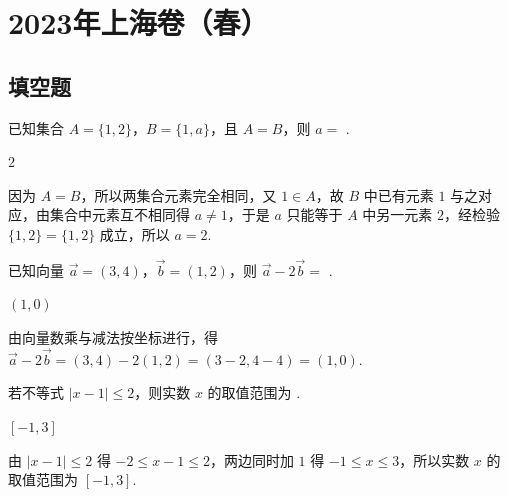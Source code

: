 \chapter{2023年上海卷（春）}

\section{填空题}

\begin{problem}
已知集合 \(A=\{1,2\}\)，\(B=\{1,a\}\)，且 \(A=B\)，则 \(a=\)\fillinblank{} .
\end{problem}

\begin{answer}
\(2\)
\end{answer}

\begin{solution}
因为 \(A=B\)，所以两集合元素完全相同，又 \(1\in A\)，故 \(B\) 中已有元素 \(1\) 与之对应，由集合中元素互不相同得 \(a\ne 1\)，于是 \(a\) 只能等于 \(A\) 中另一元素 \(2\)，经检验 \(\{1,2\}=\{1,2\}\) 成立，所以 \(a=2\).
\end{solution}

\begin{problem}
已知向量 \(\overrightarrow{a}=(3,4)\)，\(\overrightarrow{b}=(1,2)\)，则 \(\overrightarrow{a}-2\overrightarrow{b}=\)\fillinblank{} .
\end{problem}

\begin{answer}
\(\left(1,0\right)\)
\end{answer}

\begin{solution}
由向量数乘与减法按坐标进行，得 \(\overrightarrow{a}-2\overrightarrow{b}=(3,4)-2(1,2)=(3-2,4-4)=\left(1,0\right)\).
\end{solution}

\begin{problem}
若不等式 \(\left|x-1\right|\le 2\)，则实数 \(x\) 的取值范围为\fillinblank{} .
\end{problem}

\begin{answer}
\(\left[-1,3\right]\)
\end{answer}

\begin{solution}
由 \(\left|x-1\right|\le 2\) 得 \(-2\le x-1\le 2\)，两边同时加 \(1\) 得 \(-1\le x\le 3\)，所以实数 \(x\) 的取值范围为 \(\left[-1,3\right]\).
\end{solution}

